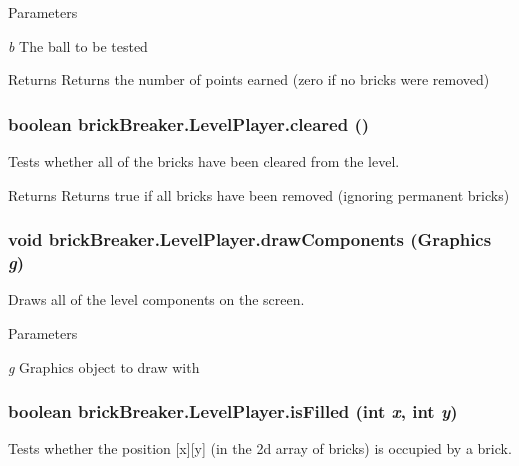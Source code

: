 \begin{DoxyParams}{Parameters}
\item[{\em b}]The ball to be tested \end{DoxyParams}
\begin{DoxyReturn}{Returns}
Returns the number of points earned (zero if no bricks were removed) 
\end{DoxyReturn}
\hypertarget{classbrick_breaker_1_1_level_player_a952e8b565a2c36ac471f7ab020972294}{
\subsubsection[{cleared}]{\setlength{\rightskip}{0pt plus 5cm}boolean brickBreaker.LevelPlayer.cleared ()}}
\label{classbrick_breaker_1_1_level_player_a952e8b565a2c36ac471f7ab020972294}
Tests whether all of the bricks have been cleared from the level. \begin{DoxyReturn}{Returns}
Returns true if all bricks have been removed (ignoring permanent bricks) 
\end{DoxyReturn}
\hypertarget{classbrick_breaker_1_1_level_player_ae54384ce113e96099dd14d73acd7de5e}{
\subsubsection[{drawComponents}]{\setlength{\rightskip}{0pt plus 5cm}void brickBreaker.LevelPlayer.drawComponents (Graphics {\em g})}}
\label{classbrick_breaker_1_1_level_player_ae54384ce113e96099dd14d73acd7de5e}
Draws all of the level components on the screen. 
\begin{DoxyParams}{Parameters}
\item[{\em g}]Graphics object to draw with \end{DoxyParams}
\hypertarget{classbrick_breaker_1_1_level_player_a298ae45b06799f0299d4b518075b9599}{
\subsubsection[{isFilled}]{\setlength{\rightskip}{0pt plus 5cm}boolean brickBreaker.LevelPlayer.isFilled (int {\em x}, \/  int {\em y})}}
\label{classbrick_breaker_1_1_level_player_a298ae45b06799f0299d4b518075b9599}
Tests whether the position \mbox{[}x\mbox{]}\mbox{[}y\mbox{]} (in the 2d array of bricks) is occupied by a brick.


